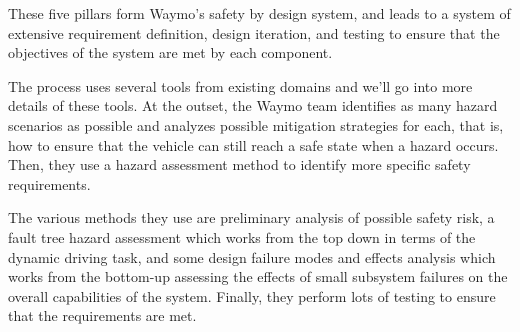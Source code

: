 These five pillars form Waymo's safety by design system, and leads to a system of extensive requirement definition, 
design iteration, and testing to ensure that the objectives of the system are met by each component. 

The process uses several tools from existing domains and we'll go into more details of these tools. 
At the outset, the Waymo team identifies as many hazard scenarios as possible and analyzes possible mitigation strategies for each, that is, 
how to ensure that the vehicle can still reach a safe state when a hazard occurs. 
Then, they use a hazard assessment method to identify more specific safety requirements. 

The various methods they use are preliminary analysis of possible safety risk, a fault tree hazard assessment which works from the top down in terms 
of the dynamic driving task, and some design failure modes and effects analysis which works from the bottom-up 
assessing the effects of small subsystem failures on the overall capabilities of the system. 
Finally, they perform lots of testing to ensure that the requirements are met. 


